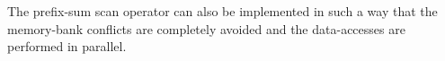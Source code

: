 The prefix-sum scan operator can also be implemented in such a way that the memory-bank conflicts are completely avoided and the data-accesses
are performed in parallel.



















